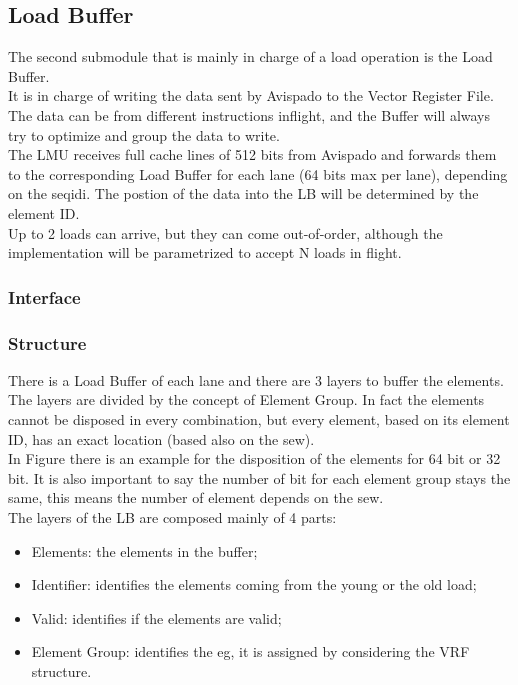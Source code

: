 \subsection{Load Buffer}
The second submodule that is mainly in charge of a load operation is the Load Buffer.\\
It is in charge of writing the data sent by Avispado to the Vector Register File. The data can be from different instructions inflight, and the Buffer will always try to optimize and group the data to write.\\

The LMU receives full cache lines of 512 bits from Avispado and forwards them to the corresponding Load Buffer for each lane (64 bits max per lane), depending on the seq\+id\+i. The postion of the data into the LB will be determined by the element ID.\\

Up to 2 loads can arrive, but they can come out-of-order, although the implementation will be parametrized to accept N loads in flight.
\subsubsection{Interface}

\subsubsection{Structure}
There is a Load Buffer of each lane and there are 3 layers to buffer the elements. The layers are divided by the concept of Element Group. In fact the elements cannot be disposed in every combination, but every element, based on its element ID, has an exact location (based also on the sew).\\

In Figure there is an example for the disposition of the elements for 64 bit or 32 bit. It is also important to say the number of bit for each element group stays the same, this means the number of element depends on the sew.\\

The layers of the LB are composed mainly of 4 parts:
\begin{itemize}
    \item Elements: the elements in the buffer;
    
    \item Identifier: identifies the elements coming from the young or the old load;
    
    \item Valid: identifies if the elements are valid;
    
    \item Element Group: identifies the eg, it is assigned by considering the VRF structure.
\end{itemize}

